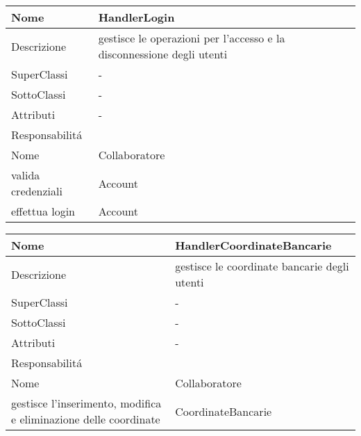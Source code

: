 \begin{center} %
    \begin{longtable}{ |p{3cm}|p{3cm}|p{3cm}|p{3cm}| }
        \hline
        Nome & \multicolumn{3}{|p{9cm}|}{HandlerLogin} \\\hline
        Descrizione & \multicolumn{3}{|p{9cm}|}{gestisce le operazioni per l'accesso e la disconnessione degli utenti} \\\hline
        SuperClassi & \multicolumn{3}{|p{9cm}|}{-} \\\hline
        SottoClassi & \multicolumn{3}{|p{9cm}|}{-} \\\hline
        Attributi & \multicolumn{3}{|p{9cm}|}{-} \\\hline
        \multicolumn{4}{|p{12cm}|}{Responsabilit\'a} \\\hline %
        \multicolumn{2}{|p{6cm}|}{Nome} & \multicolumn{2}{|p{6cm}|}{Collaboratore} \\\hline %
        \multicolumn{2}{|p{6cm}|}{valida credenziali} & \multicolumn{2}{|p{6cm}|}{Account} \\\hline
        \multicolumn{2}{|p{6cm}|}{effettua login} & \multicolumn{2}{|p{6cm}|}{Account} \\\hline
        \end{longtable}
\end{center}

\begin{center} %
    \begin{longtable}{ |p{3cm}|p{3cm}|p{3cm}|p{3cm}| }
        \hline
        Nome & \multicolumn{3}{|p{9cm}|}{HandlerCoordinateBancarie} \\\hline
        Descrizione & \multicolumn{3}{|p{9cm}|}{gestisce le coordinate bancarie degli utenti} \\\hline
        SuperClassi & \multicolumn{3}{|p{9cm}|}{-} \\\hline
        SottoClassi & \multicolumn{3}{|p{9cm}|}{-} \\\hline
        Attributi & \multicolumn{3}{|p{9cm}|}{-} \\\hline
        \multicolumn{4}{|p{12cm}|}{Responsabilit\'a} \\\hline %
        \multicolumn{2}{|p{6cm}|}{Nome} & \multicolumn{2}{|p{6cm}|}{Collaboratore} \\\hline %
        \multicolumn{2}{|p{6cm}|}{gestisce l'inserimento, modifica e eliminazione delle coordinate} & \multicolumn{2}{|p{6cm}|}{CoordinateBancarie} \\\hline
        \end{longtable}
\end{center}

